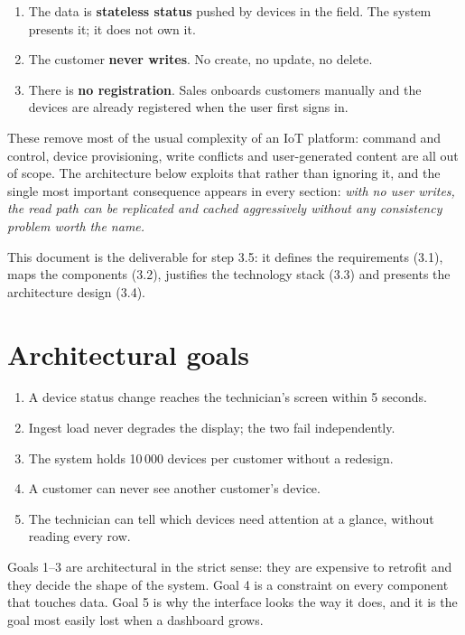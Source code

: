 \documentclass[11pt,a4paper]{article}
\begin{document}
\begin{enumerate}
  \item The data is \textbf{stateless status} pushed by devices in the field. The
        system presents it; it does not own it.
  \item The customer \textbf{never writes}. No create, no update, no delete.
  \item There is \textbf{no registration}. Sales onboards customers manually and the
        devices are already registered when the user first signs in.
\end{enumerate}

These remove most of the usual complexity of an IoT platform: command and control,
device provisioning, write conflicts and user-generated content are all out of scope.
The architecture below exploits that rather than ignoring it, and the single most
important consequence appears in every section: \emph{with no user writes, the read
path can be replicated and cached aggressively without any consistency problem worth
the name.}

This document is the deliverable for step 3.5: it defines the requirements (3.1),
maps the components (3.2), justifies the technology stack (3.3) and presents the
architecture design (3.4).

\section{Architectural goals}

\begin{enumerate}
  \item A device status change reaches the technician's screen within 5 seconds.
  \item Ingest load never degrades the display; the two fail independently.
  \item The system holds 10\,000 devices per customer without a redesign.
  \item A customer can never see another customer's device.
  \item The technician can tell which devices need attention at a glance, without
        reading every row.
\end{enumerate}

Goals 1--3 are architectural in the strict sense: they are expensive to retrofit and
they decide the shape of the system. Goal 4 is a constraint on every component that
touches data. Goal 5 is why the interface looks the way it does, and it is the goal
most easily lost when a dashboard grows.
\end{document}
